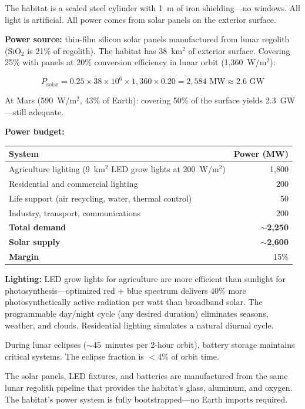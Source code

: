 \documentclass[12pt,letterpaper]{article}
\begin{document}
The habitat is a sealed steel cylinder with 1~m of iron shielding---no windows. All light is artificial. All power comes from solar panels on the exterior surface.

\textbf{Power source:} thin-film silicon solar panels manufactured from lunar regolith (SiO$_2$ is 21\% of regolith). The habitat has 38~km$^2$ of exterior surface. Covering 25\% with panels at 20\% conversion efficiency in lunar orbit (1,360~W/m$^2$):

\begin{equation}
P_{\text{solar}} = 0.25 \times 38 \times 10^6 \times 1{,}360 \times 0.20 = 2{,}584 \text{~MW} \approx 2.6 \text{~GW}
\end{equation}

At Mars (590~W/m$^2$, 43\% of Earth): covering 50\% of the surface yields 2.3~GW---still adequate.

\textbf{Power budget:}

\begin{center}
\small
\begin{tabular}{lr}
\toprule
\textbf{System} & \textbf{Power (MW)} \\
\midrule
Agriculture lighting (9~km$^2$ LED grow lights at 200~W/m$^2$) & 1,800 \\
Residential and commercial lighting & 200 \\
Life support (air recycling, water, thermal control) & 50 \\
Industry, transport, communications & 200 \\
\midrule
\textbf{Total demand} & $\sim$\textbf{2,250} \\
\textbf{Solar supply} & $\sim$\textbf{2,600} \\
\textbf{Margin} & 15\% \\
\bottomrule
\end{tabular}
\end{center}

\textbf{Lighting:} LED grow lights for agriculture are more efficient than sunlight for photosynthesis---optimized red + blue spectrum delivers 40\% more photosynthetically active radiation per watt than broadband solar. The programmable day/night cycle (any desired duration) eliminates seasons, weather, and clouds. Residential lighting simulates a natural diurnal cycle.

During lunar eclipses ($\sim$45~minutes per 2-hour orbit), battery storage maintains critical systems. The eclipse fraction is $<$4\% of orbit time.

The solar panels, LED fixtures, and batteries are manufactured from the same lunar regolith pipeline that provides the habitat's glass, aluminum, and oxygen. The habitat's power system is fully bootstrapped---no Earth imports required.
\end{document}
